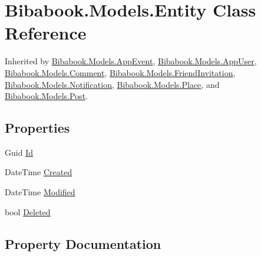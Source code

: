 \hypertarget{class_bibabook_1_1_models_1_1_entity}{}\section{Bibabook.\+Models.\+Entity Class Reference}
\label{class_bibabook_1_1_models_1_1_entity}


Inherited by \hyperlink{class_bibabook_1_1_models_1_1_app_event}{Bibabook.\+Models.\+App\+Event}, \hyperlink{class_bibabook_1_1_models_1_1_app_user}{Bibabook.\+Models.\+App\+User}, \hyperlink{class_bibabook_1_1_models_1_1_comment}{Bibabook.\+Models.\+Comment}, \hyperlink{class_bibabook_1_1_models_1_1_friend_invitation}{Bibabook.\+Models.\+Friend\+Invitation}, \hyperlink{class_bibabook_1_1_models_1_1_notification}{Bibabook.\+Models.\+Notification}, \hyperlink{class_bibabook_1_1_models_1_1_place}{Bibabook.\+Models.\+Place}, and \hyperlink{class_bibabook_1_1_models_1_1_post}{Bibabook.\+Models.\+Post}.

\subsection*{Properties}
\begin{DoxyCompactItemize}
\item 
Guid \hyperlink{class_bibabook_1_1_models_1_1_entity_a431fd045d34487ff77224ea30e5ba4e7}{Id}
\item 
Date\+Time \hyperlink{class_bibabook_1_1_models_1_1_entity_abea30a106ad1003bad9df21a6674093e}{Created}
\item 
Date\+Time \hyperlink{class_bibabook_1_1_models_1_1_entity_adf16912ed39bba32d2b2afff50bb0aec}{Modified}
\item 
bool \hyperlink{class_bibabook_1_1_models_1_1_entity_aa5b970ead38368d5b0cd46700b2a77ad}{Deleted}
\end{DoxyCompactItemize}


\subsection{Property Documentation}
\hypertarget{class_bibabook_1_1_models_1_1_entity_abea30a106ad1003bad9df21a6674093e}{}

